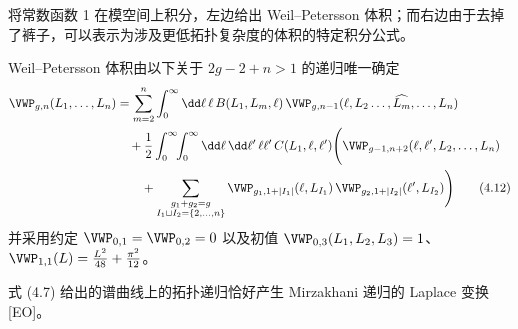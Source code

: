 将常数函数 1 在模空间上积分，左边给出 Weil--Petersson 体积；而右边由于去掉了裤子，可以表示为涉及更低拓扑复杂度的体积的特定积分公式。

\begin{theorem}[4.3（Mirzakhani 递归）]
Weil--Petersson 体积由以下关于 $2g-2+n>1$ 的递归唯一确定
\begin{align}
  \VWP_{g,n}(L_1,\dots,L_n)&=\sum_{m=2}^n\int_0^\infty \dd\ell\,\ell\,B(L_1,L_m,\ell)\,\VWP_{g,n-1}(\ell,L_2\dots,\widehat{L_m},\dots,L_n)\nonumber\\
  &\quad+\frac12\int_0^\infty\!\!\int_0^\infty \dd\ell\,\dd\ell'\,\ell\ell'\,C(L_1,\ell,\ell')\Bigg(\VWP_{g-1,n+2}(\ell,\ell',L_2,\dots,L_n)\nonumber\\
  &\qquad+\sum_{\substack{g_1+g_2=g\\ I_1\sqcup I_2=\{2,\dots,n\}}}\VWP_{g_1,1+|I_1|}(\ell,L_{I_1})\,\VWP_{g_2,1+|I_2|}(\ell',L_{I_2})\Bigg)
  \tag{4.12}
\end{align}
并采用约定 $\VWP_{0,1}=\VWP_{0,2}=0$ 以及初值 $\VWP_{0,3}(L_1,L_2,L_3)=1$、$\VWP_{1,1}(L)=\frac{L^2}{48}+\frac{\pi^2}{12}$。
\end{theorem}

式 (4.7) 给出的谱曲线上的拓扑递归恰好产生 Mirzakhani 递归的 Laplace 变换 [EO]。

